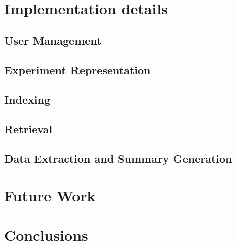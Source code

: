 \documentclass[a4paper]{usiinfbachelorproject}
\begin{document}
\section{\textbf{Implementation details}} \label{sec:impl}

\subsection{\textbf{User Management}} \label{sec:implUsers}

\subsection{\textbf{Experiment Representation}} \label{sec:implExperiments}

\subsection{\textbf{Indexing}} \label{sec:implIndexing}

\subsection{\textbf{Retrieval}} \label{sec:implRetrieval}

\subsection{\textbf{Data Extraction and Summary Generation}} \label{impl:dataSummaries}


\section{\textbf{Future Work}} \label{sec:futureWork}


\section{\textbf{Conclusions}} \label{sec:conclusions}
\end{document}
